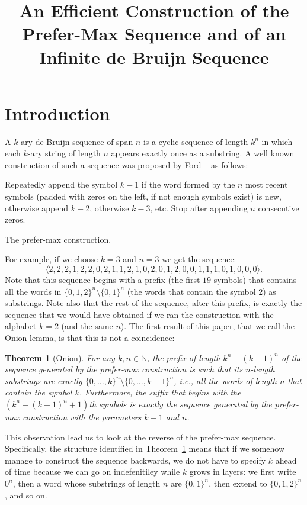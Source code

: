 \documentclass{article}
\title{An Efficient Construction of the Prefer-Max Sequence and of an Infinite de Bruijn Sequence}
\author{}
\newtheorem{theorem}{Theorem}
\theoremstyle{definition}
\newcommand{\N}{{\mathbb{N}}}
\begin{document}
\maketitle

\section{Introduction}

A $k$-ary de Bruijn sequence of span $n$ is a cyclic sequence of length $k^n$ in which each $k$-ary string of length $n$ appears exactly once as
a substring. A well known construction of such a sequence was proposed by Ford ~\cite{Ford57} as follows:

\begin{algorithm}
Repeatedly append the symbol $k-1$ if the word formed by the $n$ most recent symbols (padded with zeros on the left, if not enough symbols exist) is new, otherwise append $k-2$, otherwise $k-3$, etc. Stop after appending $n$ consecutive zeros. 
\caption{The prefer-max construction.}
\end{algorithm}


For example, if we choose $k=3$ and $n=3$ we get the sequence:
$$\langle2,2,2,1,2,2,0,2,1,1,2,1,0,2,0,1,2,0,0,1,1,1,0,1,0,0,0\rangle.$$
Note that this sequence begins with a prefix (the first $19$ symbols) that contains all the words in $\{0,1,2\}^n \setminus \{0,1\}^n$  (the words that contain the symbol $2$) as substrings. Note also that the rest of the sequence, after this prefix, is exactly the sequence that we would have obtained if we ran the construction with the alphabet $k=2$ (and the same $n$). The first result of this paper, that we call the Onion lemma, is that this is not a coincidence:

\begin{theorem}[Onion]
	For any $k,n \in \N$, the prefix of length $k^n-(k-1)^n$ of the sequence generated by the prefer-max construction is such that its $n$-length substrings are exactly $\{0,\dots,k\}^n \setminus \{0,\dots,k-1\}^n$, i.e., all the words of length $n$ that contain the symbol $k$. Furthermore, the suffix that begins with the 
	$(k^n-(k-1)^n+1)$th symbols is exactly the sequence generated by the prefer-max construction with the parameters $k-1$ and $n$.
	\label{thm:onion}
\end{theorem}

This observation lead us to look at the reverse of the prefer-max sequence. Specifically, the structure identified in Theorem~\ref{thm:onion} means that if we somehow manage to construct the sequence backwards, we do not have to specify $k$ ahead of time because we can go on indefenitiley while $k$ grows in layers: we first write $0^n$, then a word whose substrings of length $n$ are $\{0,1\}^n$, then extend to $\{0,1,2\}^n$, and so on.
\end{document}
